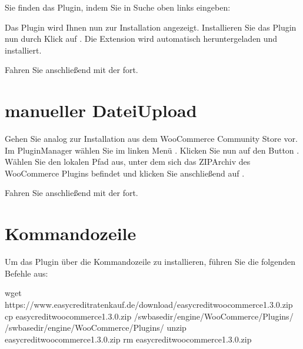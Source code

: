 \documentclass[a4paper,10pt,openany,oneside,ngerman]{sphinxmanual}
\begin{document}
Sie finden das Plugin, indem Sie in Suche oben links  eingeben:

\noindent{}

Das Plugin wird Ihnen nun zur Installation angezeigt. Installieren Sie das Plugin nun durch Klick auf .
Die Extension wird automatisch heruntergeladen und installiert.

Fahren Sie anschließend mit der {\hyperref[\detokenize{configuration:configuration}]{}} fort.


\section{manueller Datei\sphinxhyphen{}Upload}
\label{\detokenize{installation:manueller-datei-upload}}
Gehen Sie analog zur Installation aus dem WooCommerce Community Store vor. Im Plugin\sphinxhyphen{}Manager wählen Sie im linken Menü . Klicken Sie nun auf den Button . Wählen Sie den lokalen Pfad aus, unter dem sich das ZIP\sphinxhyphen{}Archiv des WooCommerce Plugins befindet und klicken Sie anschließend auf .

Fahren Sie anschließend mit der {\hyperref[\detokenize{configuration:configuration}]{}} fort.

\noindent{}


\section{Kommandozeile}
\label{\detokenize{installation:kommandozeile}}
Um das Plugin über die Kommandozeile zu installieren, führen Sie die folgenden Befehle aus:

\begin{sphinxVerbatim}[commandchars=\\\{\}]
 wget https://www.easycredit\PYGZhy{}ratenkauf.de/download/easycredit\PYGZhy{}woocommerce\PYGZhy{}1.3.0.zip
 cp easycredit\PYGZhy{}woocommerce\PYGZhy{}1.3.0.zip /sw\PYGZhy{}base\PYGZhy{}dir/engine/WooCommerce/Plugins/
  /sw\PYGZhy{}base\PYGZhy{}dir/engine/WooCommerce/Plugins/
 unzip easycredit\PYGZhy{}woocommerce\PYGZhy{}1.3.0.zip
 rm easycredit\PYGZhy{}woocommerce\PYGZhy{}1.3.0.zip
\end{sphinxVerbatim}
\end{document}

